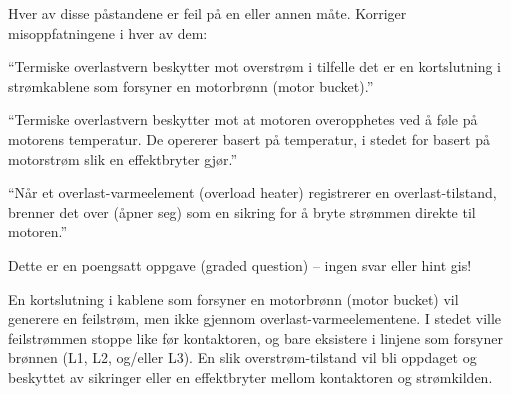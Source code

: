 

Hver av disse påstandene er feil på en eller annen måte. Korriger misoppfatningene i hver av dem:

\vskip 20pt {\narrower \noindent \baselineskip5pt

``Termiske overlastvern beskytter mot overstrøm i tilfelle det er en kortslutning i strømkablene som forsyner en motorbrønn (motor bucket).''

\par} \vskip 100pt


\vskip 20pt {\narrower \noindent \baselineskip5pt

``Termiske overlastvern beskytter mot at motoren overopphetes ved å føle på motorens temperatur. De opererer basert på temperatur, i stedet for basert på motorstrøm slik en effektbryter gjør.''

\par} \vskip 100pt


\vskip 20pt {\narrower \noindent \baselineskip5pt

``Når et overlast-varmeelement (overload heater) registrerer en overlast-tilstand, brenner det over (åpner seg) som en sikring for å bryte strømmen direkte til motoren.''

\par} \vskip 50pt



\vfil 

\eject






Dette er en poengsatt oppgave (graded question) -- ingen svar eller hint gis!
 






En kortslutning i kablene som forsyner en motorbrønn (motor bucket) vil generere en feilstrøm, men ikke gjennom overlast-varmeelementene. I stedet ville feilstrømmen stoppe like før kontaktoren, og bare eksistere i linjene som forsyner brønnen (L1, L2, og/eller L3). En slik overstrøm-tilstand vil bli oppdaget og beskyttet av sikringer eller en effektbryter mellom kontaktoren og strømkilden.

